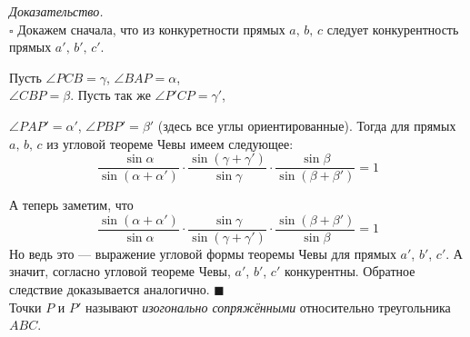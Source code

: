 \documentclass[14pt]{extarticle}
\theoremstyle{definition}
\theoremstyle{theorem}
\renewenvironment{proof}
    {\noindent \textit{Доказательство.}\\
	\indent $\square$}
	{ $\blacksquare$\\ }
\begin{document}

\begin{proof}
Докажем сначала, что из конкуретности прямых \(a, \, b, \, c\)
следует конкурентность прямых \(a', \, b', \, c'\).

Пусть \(\angle PCB = \gamma\), \( \angle BAP = \alpha\), \\
\(\angle CBP = \beta\). Пусть так же \(\angle P'CP = \gamma'\), \par
\begin{figure}
    \vspace{-2cm}
\end{figure}
\noindent\(\angle PAP' = \alpha'\), \(\angle PBP' = \beta'\) (здесь все углы
ориентированные). Тогда для прямых  \(a, \, b, \, c\) из угловой теореме
Чевы имеем следующее:
\[
\frac{\sin \alpha}{\sin(\alpha + \alpha ')} \cdot
\frac{\sin(\gamma + \gamma ')}{\sin \gamma} \cdot
\frac{\sin \beta}{\sin(\beta + \beta ')} 
 = 1
\]

\noindent А теперь заметим, что 
\[
\frac{\sin(\alpha + \alpha ')}{\sin \alpha} \cdot
\frac{\sin \gamma}{\sin(\gamma + \gamma ')} \cdot
\frac{\sin(\beta + \beta ')}{\sin \beta} 
 = 1
\]
Но ведь это --- выражение угловой формы теоремы Чевы для прямых
\(a'\), \(b'\), \(c'\). А значит, согласно угловой теореме Чевы, 
\(a'\), \(b'\), \(c'\) конкурентны.
Обратное следствие доказывается аналогично.
\end{proof}
Точки \(P\) и \(P'\) называют \textit{изогонально сопряжёнными} относительно
треугольника \(ABC\).\\
\end{document}
